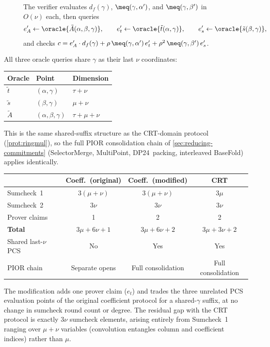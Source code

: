 \begin{figure}[H]
\begin{algorithm}[H]
\begin{algorithmic}[1]
\STATE \label{step:coeff-queries}
The verifier evaluates $d_f(\gamma)$,
$\meq(\gamma,\alpha')$, and $\meq(\gamma,\beta')$
in $O(\nu)$ each, then queries
\[
    e'_A \gets \oracle{\tilde{A}(\alpha,\beta,\gamma)}, \qquad
    e'_t \gets \oracle{\tilde{t}(\alpha,\gamma)}, \qquad
    e'_s \gets \oracle{\tilde{s}(\beta,\gamma)},
\]
and checks
$c = e'_A \cdot d_f(\gamma) + \rho\, \meq(\gamma,\alpha')\, e'_t
     + \rho^2\, \meq(\gamma,\beta')\, e'_s$.

\end{algorithmic}
\end{algorithm}
\end{figure}


All three oracle queries share $\gamma$ as their last $\nu$
coordinates:
\begin{center}
\begin{tabular}{lll}
    Oracle & Point & Dimension \\
    \hline
    $\tilde{t}$ & $(\alpha, \gamma)$ & $\tau + \nu$ \\
    $\tilde{s}$ & $(\beta, \gamma)$ & $\mu + \nu$ \\
    $\tilde{A}$ & $(\alpha, \beta, \gamma)$ & $\tau + \mu + \nu$
\end{tabular}
\end{center}
This is the same shared-suffix structure as the CRT-domain
protocol (\cref{prot:ringmul}), so the full PIOR consolidation
chain of \cref{sec:reducing-commitments} (SelectorMerge, MultiPoint,
DP24~packing, interleaved BaseFold) applies identically.

\begin{center}
\begin{tabular}{lccc}
    & Coeff.\ (original) & Coeff.\ (modified) & CRT \\
    \hline
    Sumcheck~1 & $3(\mu+\nu)$ & $3(\mu+\nu)$ & $3\mu$ \\
    Sumcheck~2 & $3\nu$ & $3\nu$ & $3\nu$ \\
    Prover claims & 1 & 2 & 2 \\
    \textbf{Total} & $3\mu + 6\nu + 1$ & $3\mu + 6\nu + 2$ & $3\mu + 3\nu + 2$ \\
    \hline
    Shared last-$\nu$ PCS & No & Yes & Yes \\
    PIOR chain & Separate opens & Full consolidation & Full consolidation
\end{tabular}
\end{center}
The modification adds one prover claim ($e_t$) and trades the three
unrelated PCS evaluation points of the original coefficient protocol
for a shared-$\gamma$ suffix, at no change in sumcheck round count or
degree.  The residual gap with the CRT protocol is exactly $3\nu$
sumcheck elements, arising entirely from Sumcheck~1 ranging over
$\mu + \nu$ variables (convolution entangles column and coefficient
indices) rather than $\mu$.

